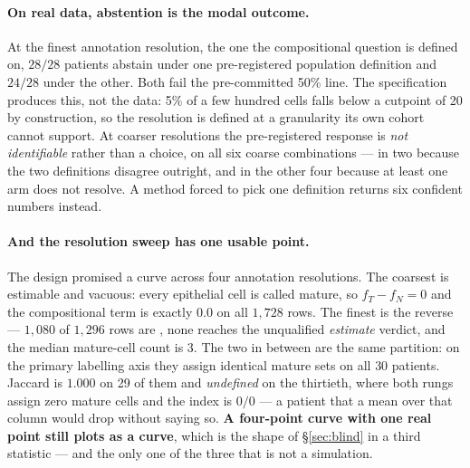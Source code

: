 \paragraph{On real data, abstention is the modal outcome.} At the finest
annotation resolution, the one the compositional question is defined on, $28/28$
patients abstain under one pre-registered population definition and $24/28$
under the other. Both fail the pre-committed 50\% line. The specification
produces this, not the data: 5\% of a few hundred cells falls below a cutpoint of
20 by construction, so the resolution is defined at a granularity its own cohort
cannot support. At coarser resolutions the pre-registered response is \emph{not identifiable}
rather than a choice, on all six coarse combinations --- in two because the two
definitions disagree outright, and in the other four because at least one arm
does not resolve. A method forced to pick one definition returns six confident
numbers instead.

\paragraph{And the resolution sweep has one usable point.} The design promised a
curve across four annotation resolutions. The coarsest is estimable and vacuous:
every epithelial cell is called mature, so $f_T - f_N = 0$ and the compositional
term is exactly $0.0$ on all $1{,}728$ rows. The finest is the reverse ---
$1{,}080$ of $1{,}296$ rows are \notest{}, none reaches the unqualified
\emph{estimate} verdict, and the median mature-cell count is $3$. The two in
between are the same partition: on the primary labelling axis they assign
identical mature sets on all $30$ patients. Jaccard is $1.000$ on 29 of them and
\emph{undefined} on the thirtieth, where both rungs assign zero mature cells and
the index is $0/0$ --- a patient that a mean over that column would drop without
saying so. \textbf{A four-point curve with one real point still plots as a
curve}, which is the shape of \S\ref{sec:blind} in a third statistic --- and the
only one of the three that is not a simulation.
